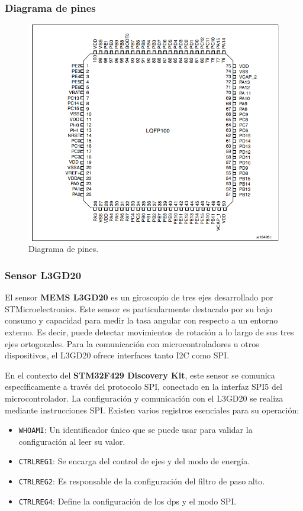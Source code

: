 \subsubsection{Diagrama de pines}
\begin{figure}[H]
    \centering
    \includegraphics[scale=0.5]{images/diag_pin.png}
    \caption{Diagrama de pines. \cite{STM32F429xxDatasheet}}
    \label{fig:pines}
\end{figure}
\subsubsection{Sensor L3GD20}
El sensor \textbf{MEMS L3GD20} es un giroscopio de tres ejes desarrollado por STMicroelectronics. Este sensor es particularmente destacado por su bajo consumo y capacidad para medir la tasa angular con respecto a un entorno externo. Es decir, puede detectar movimientos de rotación a lo largo de sus tres ejes ortogonales. Para la comunicación con microcontroladores u otros dispositivos, el L3GD20 ofrece interfaces tanto I2C como SPI.

En el contexto del \textbf{STM32F429 Discovery Kit}, este sensor se comunica específicamente a través del protocolo SPI, conectado en la interfaz SPI5 del microcontrolador. La configuración y comunicación con el L3GD20 se realiza mediante instrucciones SPI. Existen varios registros esenciales para su operación:

\begin{itemize}
    \item \texttt{WHOAMI}: Un identificador único que se puede usar para validar la configuración al leer su valor.
    \item \texttt{CTRLREG1}: Se encarga del control de ejes y del modo de energía.
    \item \texttt{CTRLREG2}: Es responsable de la configuración del filtro de paso alto.
    \item \texttt{CTRLREG4}: Define la configuración de los dps y el modo SPI.
\end{itemize}

